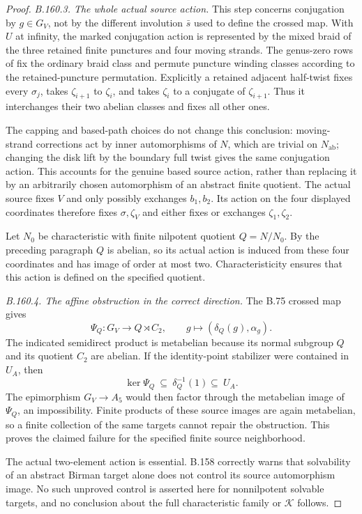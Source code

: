 \begin{proof}
\emph{B.160.3. The whole actual source action.}
This step concerns conjugation by \(g\in G_V\), not by the
different involution \(\bar s\) used to define the crossed
map. With \(U\) at infinity, the marked conjugation action
is represented by the mixed braid of the three retained
finite punctures and four moving strands. The genus-zero
rows of \citet[Proposition~3.2 and its proof, pp.~124--125]
{BBellingeriGodelleGuaschi2017} fix the ordinary braid class
and permute puncture winding classes according to the
retained-puncture permutation. Explicitly a retained adjacent
half-twist fixes every \(\sigma_j\), takes
\(\zeta_{i+1}\) to \(\zeta_i\), and takes \(\zeta_i\)
to a conjugate of \(\zeta_{i+1}\). Thus it interchanges their
two abelian classes and fixes all other ones.

The capping and based-path choices do not change this conclusion:
moving-strand corrections act by inner automorphisms of \(N\),
which are trivial on \(N_{\mathrm{ab}}\); changing the disk lift
by the boundary full twist gives the same conjugation action.
This accounts for the genuine based source action, rather than
replacing it by an arbitrarily chosen automorphism of an
abstract finite quotient. The actual source fixes \(V\) and
only possibly exchanges \(b_1,b_2\). Its action on the four
displayed coordinates therefore fixes \(\sigma,\zeta_V\)
and either fixes or exchanges \(\zeta_1,\zeta_2\).

Let \(N_0\) be characteristic with finite nilpotent quotient
\(Q=N/N_0\). By the preceding paragraph \(Q\) is abelian,
so its actual action is induced from these four coordinates
and has image of order at most two. Characteristicity ensures
that this action is defined on the specified quotient.

\emph{B.160.4. The affine obstruction in the correct direction.}
The B.75 crossed map gives
\[
 \Psi_Q:G_V\longrightarrow Q\rtimes C_2,
 \qquad g\longmapsto(\delta_Q(g),\alpha_g).
\]
The indicated semidirect product is metabelian because its
normal subgroup \(Q\) and its quotient \(C_2\) are abelian.
If the identity-point stabilizer were contained in \(U_A\),
then
\[
 \ker\Psi_Q\ \subseteq\ \delta_Q^{-1}(1)
                  \subseteq\ U_A.
\]
The epimorphism \(G_V\to A_5\) would then factor through
the metabelian image of \(\Psi_Q\), an impossibility.
Finite products of these source images are again metabelian,
so a finite collection of the same targets cannot repair the
obstruction. This proves the claimed failure for the specified
finite source neighborhood.

The actual two-element action is essential. B.158 correctly
warns that solvability of an abstract Birman target alone
does not control its source automorphism image. No such
unproved control is asserted here for nonnilpotent solvable
targets, and no conclusion about the full characteristic
family or \(\mathcal K\) follows.
\end{proof}


